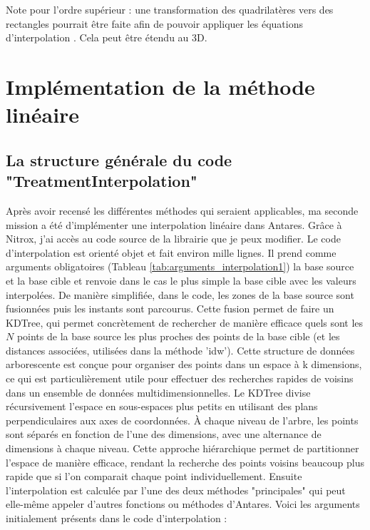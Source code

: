Note pour l'ordre supérieur : une transformation des quadrilatères vers des rectangles pourrait être faite afin de pouvoir appliquer les équations d'interpolation \cite{camarero2024}. Cela peut être étendu au 3D.




\newpage
\section{Implémentation de la méthode linéaire}

\subsection{La structure générale du code "TreatmentInterpolation"}

Après avoir recensé les différentes méthodes qui seraient applicables, ma seconde mission a été d'implémenter une interpolation linéaire dans Antares. Grâce à Nitrox, j'ai accès au code source de la librairie que je peux modifier. Le code d'interpolation est orienté objet et fait environ mille lignes. 
Il prend comme arguments obligatoires (Tableau \ref{tab:arguments_interpolation1}) la base source et la base cible et renvoie dans le cas le plus simple la base cible avec les valeurs interpolées.
De manière simplifiée, dans le code, les zones de la base source sont fusionnées puis les instants sont parcourus. 
Cette fusion permet de faire un \ac{KDTree}, qui permet concrètement de rechercher de manière efficace quels sont les \( N \) points de la base source les plus proches des points de la base cible (et les distances associées, utilisées dans la méthode 'idw').
Cette structure de données arborescente est conçue pour organiser des points dans un espace à k dimensions, ce qui est particulièrement utile pour effectuer des recherches rapides de voisins dans un ensemble de données multidimensionnelles.
Le KDTree divise récursivement l'espace en sous-espaces plus petits en utilisant des plans perpendiculaires aux axes de coordonnées. À chaque niveau de l'arbre, les points sont séparés en fonction de l'une des dimensions, avec une alternance de dimensions à chaque niveau. Cette approche hiérarchique permet de partitionner l'espace de manière efficace, rendant la recherche des points voisins beaucoup plus rapide que si l'on comparait chaque point individuellement.
Ensuite l'interpolation est calculée par l'une des deux méthodes "principales" qui peut elle-même appeler d'autres fonctions ou méthodes d'Antares.
Voici les arguments initialement présents dans le code d'interpolation :


